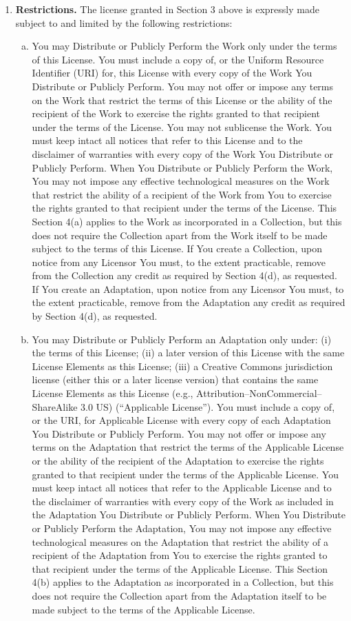 \documentclass[12pt,letterpaper,oneside,final]{memoir}
\begin{document}
\begin{appendices}
\begin{enumerate}[1.]
\item \textbf{Restrictions.} The license granted in Section 3 above is expressly made subject to and limited by the following restrictions:
   \begin{enumerate}[a.]
   \item You may Distribute or Publicly Perform the Work only under the terms of this License. You must include a copy of, or the Uniform Resource Identifier (URI) for, this License with every copy of the Work You Distribute or Publicly Perform. You may not offer or impose any terms on the Work that restrict the terms of this License or the ability of the recipient of the Work to exercise the rights granted to that recipient under the terms of the License. You may not sublicense the Work. You must keep intact all notices that refer to this License and to the disclaimer of warranties with every copy of the Work You Distribute or Publicly Perform. When You Distribute or Publicly Perform the Work, You may not impose any effective technological measures on the Work that restrict the ability of a recipient of the Work from You to exercise the rights granted to that recipient under the terms of the License. This Section 4(a) applies to the Work as incorporated in a Collection, but this does not require the Collection apart from the Work itself to be made subject to the terms of this License. If You create a Collection, upon notice from any Licensor You must, to the extent practicable, remove from the Collection any credit as required by Section 4(d), as requested. If You create an Adaptation, upon notice from any Licensor You must, to the extent practicable, remove from the Adaptation any credit as required by Section 4(d), as requested.
   \item You may Distribute or Publicly Perform an Adaptation only under: (i) the terms of this License; (ii) a later version of this License with the same License Elements as this License; (iii) a Creative Commons jurisdiction license (either this or a later license version) that contains the same License Elements as this License (e.g., Attribution--NonCommercial--ShareAlike 3.0 US) (``Applicable License''). You must include a copy of, or the URI, for Applicable License with every copy of each Adaptation You Distribute or Publicly Perform. You may not offer or impose any terms on the Adaptation that restrict the terms of the Applicable License or the ability of the recipient of the Adaptation to exercise the rights granted to that recipient under the terms of the Applicable License. You must keep intact all notices that refer to the Applicable License and to the disclaimer of warranties with every copy of the Work as included in the Adaptation You Distribute or Publicly Perform. When You Distribute or Publicly Perform the Adaptation, You may not impose any effective technological measures on the Adaptation that restrict the ability of a recipient of the Adaptation from You to exercise the rights granted to that recipient under the terms of the Applicable License. This Section 4(b) applies to the Adaptation as incorporated in a Collection, but this does not require the Collection apart from the Adaptation itself to be made subject to the terms of the Applicable License.

\end{enumerate}
\end{enumerate}
\end{appendices}
\end{document}
